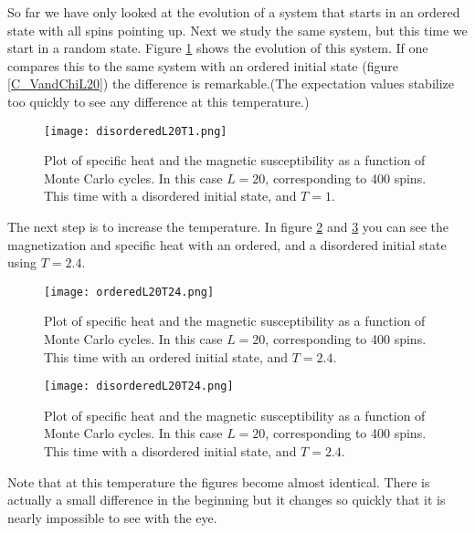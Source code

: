 \documentclass{aa}   %
\begin{document}
So far we have only looked at the evolution of a system that starts in an ordered state with all spins pointing up.
Next we study the same system, but this time we start in a random state. Figure \ref{disorderedL20T1} shows the evolution of this system. If one compares this to the same system with an ordered initial state (figure \ref{C_VandChiL20}) the difference is remarkable.(The expectation values stabilize too quickly to see any difference at this temperature.)

\begin{figure}
 \texttt{[image: disorderedL20T1.png]}
 \caption{Plot of specific heat and the magnetic susceptibility as a function of Monte Carlo cycles. In this case $L=20$, corresponding to 400 spins. This time with a disordered initial state, and $T=1$.}
\label{disorderedL20T1}
\end{figure}

The next step is to increase the temperature. In figure \ref{orderedL20T24} and \ref{disorderedL20T24} you can see the magnetization and specific heat with an ordered, and a disordered initial state using $T=2.4$.

\begin{figure}
 \texttt{[image: orderedL20T24.png]}
 \caption{Plot of specific heat and the magnetic susceptibility as a function of Monte Carlo cycles. In this case $L=20$, corresponding to 400 spins. This time with an ordered initial state, and $T=2.4$.}
\label{orderedL20T24}
\end{figure}

\begin{figure}
 \texttt{[image: disorderedL20T24.png]}
 \caption{Plot of specific heat and the magnetic susceptibility as a function of Monte Carlo cycles. In this case $L=20$, corresponding to 400 spins. This time with a disordered initial state, and $T=2.4$.}
\label{disorderedL20T24}
\end{figure}
Note that at this temperature the figures become almost identical. There is actually a small difference in the beginning but it changes so quickly that it is nearly impossible to see with the eye.
\end{document}
